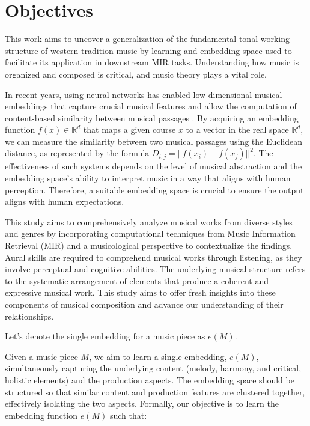 \section{Objectives}

This work aims to uncover a generalization of the fundamental tonal-working structure of western-tradition music by learning and embedding space used to facilitate its application in downstream MIR tasks. Understanding how music is organized and composed is critical, and music theory plays a vital role.

In recent years, using neural networks has enabled low-dimensional musical embeddings that capture crucial musical features and allow the computation of content-based similarity between musical passages \cite{}. By acquiring an embedding function $f(x) \in \mathbb{R}^d$ that maps a given course $x$ to a vector in the real space $\mathbb{R}^d$, we can measure the similarity between two musical passages using the Euclidean distance, as represented by the formula $D_{i,j} = ||f(x_i) - f(x_j)||^2$. The effectiveness of such systems depends on the level of musical abstraction and the embedding space's ability to interpret music in a way that aligns with human perception. Therefore, a suitable embedding space is crucial to ensure the output aligns with human expectations.

This study aims to comprehensively analyze musical works from diverse styles and genres by incorporating computational techniques from Music Information Retrieval (MIR) and a musicological perspective to contextualize the findings. Aural skills are required to comprehend musical works through listening, as they involve perceptual and cognitive abilities. The underlying musical structure refers to the systematic arrangement of elements that produce a coherent and expressive musical work. This study aims to offer fresh insights into these components of musical composition and advance our understanding of their relationships.

Let's denote the single embedding for a music piece as $e(M)$.

Given a music piece $M$, we aim to learn a single embedding, $e(M)$, simultaneously capturing the underlying content (melody, harmony, and critical, holistic elements) and the production aspects. The embedding space should be structured so that similar content and production features are clustered together, effectively isolating the two aspects. Formally, our objective is to learn the embedding function $e(M)$ such that:

